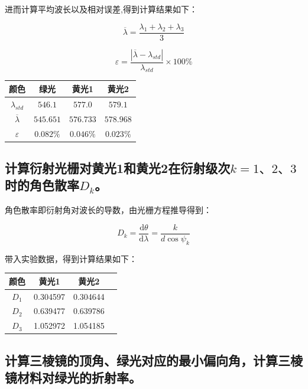 \documentclass{ctexart}
\begin{document}
进而计算平均波长以及相对误差,得到计算结果如下：

$$ \overline{\lambda} = \frac{\lambda_1+\lambda_2+\lambda_3}{3} $$

$$ \varepsilon = \frac{\left|\overline{\lambda}-\lambda_{std}\right|}{\lambda_{std}} \times 100\% $$



\begin{table}[!h]
    \centering
    \begin{tabular}{c ccc}
        \toprule
        \textbf{颜色} & \textbf{绿光} & \textbf{黄光1} & \textbf{黄光2}\\
        \midrule
        $\lambda_{std}$ & $546.1$ & $577.0$ & $579.1$\\
        $\overline{\lambda}$ & $545.651$ & $576.733$ & $578.968$\\
        $\varepsilon$ & $0.082\% $ & $0.046\% $ & $0.023\% $\\
        \bottomrule
    \end{tabular}
\end{table}




\subsection{计算衍射光栅对黄光1和黄光2在衍射级次$k=1、2、3$时的角色散率$D_k$。}

角色散率即衍射角对波长的导数，由光栅方程推导得到：

$$ D_k = \frac{\mathrm{d}\theta}{\mathrm{d}\lambda} = \frac{k}{d\cos\psi_k} $$

带入实验数据，得到计算结果如下：

\begin{table}[!h]
    \centering
    \begin{tabular}{c ccc}
        \toprule
        \textbf{颜色} & \textbf{黄光1} & \textbf{黄光2} \\
        \midrule
        $D_1$ & 0.304597 & 0.304644 \\
        $D_2$ & 0.639477 & 0.639786 \\
        $D_3$ & 1.052972 & 1.054185 \\
        \bottomrule
    \end{tabular}
\end{table}

\subsection{计算三棱镜的顶角、绿光对应的最小偏向角，计算三棱镜材料对绿光的折射率。}
\end{document}
